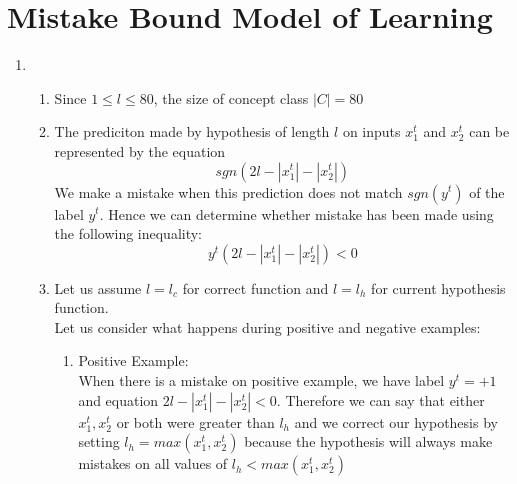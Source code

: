\section{Mistake Bound Model of Learning}\label{sec:q2}

\begin{enumerate}
    \item~
    
    
	\begin{enumerate}
		\item
			Since $1 \leq l \leq 80$, the size of concept class $|C| = 80$	
		
		\item
			The prediciton made by hypothesis of length $l$ on inputs $x_1^t$ and $x_2^t$ can be represented by the equation $$ sgn(2l - |x_1^t| - |x_2^t|) $$ 
			We make a mistake when this prediction does not match $sgn(y^t)$ of the label $y^t$. Hence we can determine whether mistake has been made using the following inequality:					
			\begin{equation}
				\boxed{				
					y^t(2l - |x_1^t| - |x_2^t|) < 0	
				}	
			\end{equation}
	
		\item
		Let us assume $l = l_c$ for correct function and $l = l_h$ for current hypothesis function.\\
		Let us consider what happens during positive and negative examples:
		\begin{enumerate}
			\item Positive Example: \\
			When there is a mistake on positive example, we have label $y^t = +1$ and equation $2l - |x_1^t| - |x_2^t| < 0$. Therefore we can say that either $x_1^t, x_2^t$ or both were greater than $l_h$ and we correct our hypothesis by setting $l_h = max(x_1^t, x_2^t)$ because the hypothesis will always make mistakes on all values of $l_h < max(x_1^t, x_2^t)$
			

\end{enumerate}
\end{enumerate}
\end{enumerate}
